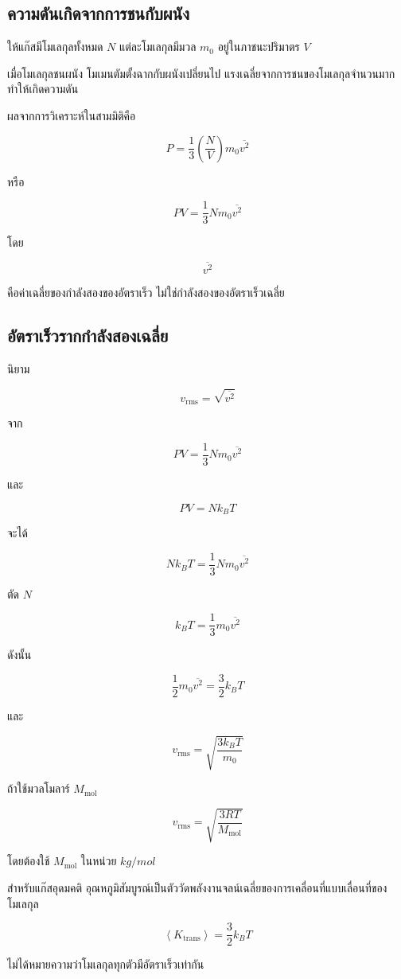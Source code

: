 \subsection{ความดันเกิดจากการชนกับผนัง}

ให้แก๊สมีโมเลกุลทั้งหมด $N$ แต่ละโมเลกุลมีมวล $m_0$ อยู่ในภาชนะปริมาตร $V$

เมื่อโมเลกุลชนผนัง โมเมนตัมตั้งฉากกับผนังเปลี่ยนไป แรงเฉลี่ยจากการชนของโมเลกุลจำนวนมากทำให้เกิดความดัน

ผลจากการวิเคราะห์ในสามมิติคือ

\[
\boxed{
P
=
\frac{1}{3}
\left(\frac{N}{V}\right)
 m_0\overline{v^2}
}
\]

หรือ

\[
\boxed{
PV
=
\frac{1}{3}Nm_0\overline{v^2}
}
\]

โดย

\[
\overline{v^2}
\]

คือค่าเฉลี่ยของกำลังสองของอัตราเร็ว ไม่ใช่กำลังสองของอัตราเร็วเฉลี่ย

\subsection{อัตราเร็วรากกำลังสองเฉลี่ย}

นิยาม

\[
\boxed{
v_{\text{rms}}
=
\sqrt{\overline{v^2}}
}
\]

จาก

\[
PV
=
\frac{1}{3}Nm_0\overline{v^2}
\]

และ

\[
PV=Nk_BT
\]

จะได้

\[
Nk_BT
=
\frac{1}{3}Nm_0\overline{v^2}
\]

ตัด $N$

\[
k_BT
=
\frac{1}{3}m_0\overline{v^2}
\]

ดังนั้น

\[
\boxed{
\frac{1}{2}m_0\overline{v^2}
=
\frac{3}{2}k_BT
}
\]

และ

\[
\boxed{
 v_{\text{rms}}
=
\sqrt{\frac{3k_BT}{m_0}}
}
\]

ถ้าใช้มวลโมลาร์ $M_{\text{mol}}$

\[
\boxed{
 v_{\text{rms}}
=
\sqrt{\frac{3RT}{M_{\text{mol}}}}
}
\]

โดยต้องใช้ $M_{\text{mol}}$ ในหน่วย $\si{kg/mol}$

\begin{tcolorbox}[title=ความหมายของอุณหภูมิในทฤษฎีจลน์]
สำหรับแก๊สอุดมคติ อุณหภูมิสัมบูรณ์เป็นตัววัดพลังงานจลน์เฉลี่ยของการเคลื่อนที่แบบเลื่อนที่ของโมเลกุล

\[
\left\langle K_{\text{trans}}\right\rangle
=
\frac{3}{2}k_BT
\]

ไม่ได้หมายความว่าโมเลกุลทุกตัวมีอัตราเร็วเท่ากัน
\end{tcolorbox}

